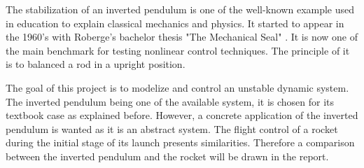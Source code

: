 %
%
%
%
%

The stabilization of an inverted pendulum is one of the well-known example used in education to explain classical mechanics and physics. It started to appear in the 1960's with Roberge's bachelor thesis "The Mechanical Seal" \citep{the article}. It is now one of the main benchmark for testing nonlinear control techniques. The principle of it is to balanced a rod in a upright position.

The goal of this project is to modelize and control an unstable dynamic system. The inverted pendulum being one of the available system, it is chosen for its textbook case as explained before. However, a concrete application of the inverted pendulum is wanted as it is an abstract system. The flight control of a rocket during the initial stage of its launch presents similarities. Therefore a comparison between the inverted pendulum and the rocket will be drawn in the report.